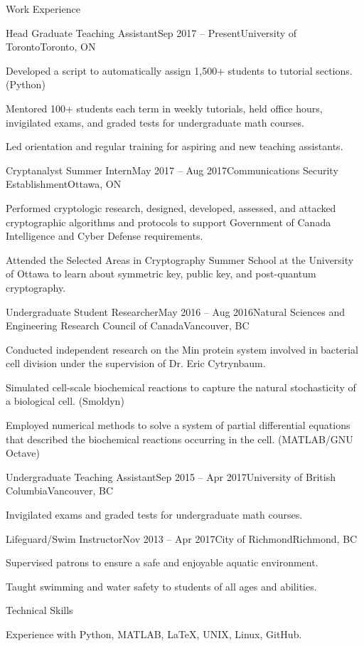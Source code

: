 \documentclass{resume}
\begin{document}
\begin{rSection}{Work Experience}
\begin{rSubsection}{Head Graduate Teaching Assistant}{Sep 2017 -- Present}{University of Toronto}{Toronto, ON}
    \item Developed a script to automatically assign 1,500+ students to tutorial sections. (Python)
    \item Mentored 100+ students each term in weekly tutorials, held office hours, invigilated exams, and graded tests for undergraduate math courses.
    \item Led orientation and regular training for aspiring and new teaching assistants.
\end{rSubsection}

\begin{rSubsection}
    {Cryptanalyst Summer Intern}{May 2017 -- Aug 2017}{Communications Security Establishment}{Ottawa, ON}
    \item Performed cryptologic research, designed, developed, assessed, and attacked cryptographic algorithms and protocols to support Government of Canada Intelligence and Cyber Defense requirements.
    \item Attended the Selected Areas in Cryptography Summer School at the University of Ottawa to learn about symmetric key, public key, and post-quantum cryptography.
\end{rSubsection}

\begin{rSubsection}
    {Undergraduate Student Researcher}{May 2016 -- Aug 2016}{Natural Sciences and Engineering Research Council of Canada}{Vancouver, BC}
    \item Conducted independent research on the Min protein system involved in bacterial cell division under the supervision of Dr. Eric Cytrynbaum.
    \item Simulated cell-scale biochemical reactions to capture the natural stochasticity of a biological cell. (Smoldyn)
    \item Employed numerical methods to solve a system of partial differential equations that described the biochemical reactions occurring in the cell. (MATLAB/GNU Octave)
\end{rSubsection}

\begin{rSubsection}
{Undergraduate Teaching Assistant}{Sep 2015 -- Apr 2017}{University of British Columbia}{Vancouver, BC}
    \item Invigilated exams and graded tests for undergraduate math courses.
\end{rSubsection}

\begin{rSubsection}
{Lifeguard/Swim Instructor}{Nov 2013 -- Apr 2017}{City of Richmond}{Richmond, BC}
    \item Supervised patrons to ensure a safe and enjoyable aquatic environment.
    \item Taught swimming and water safety to students of all ages and abilities.
\end{rSubsection}

\end{rSection}

\begin{rSection}{Technical Skills}

{\normalfont Experience with Python, MATLAB, LaTeX, UNIX, Linux, GitHub.}

\end{rSection}
\end{document}
